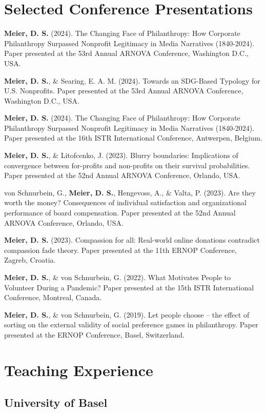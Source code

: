 \documentclass[11pt,letterpaper]{article}
\begin{document}
\section*{Selected Conference Presentations}

\textbf{Meier, D. S.} (2024). The Changing Face of Philanthropy: How Corporate Philanthropy Surpassed Nonprofit Legitimacy in Media Narratives (1840-2024). Paper presented at the 53rd Annual ARNOVA Conference, Washington D.C., USA.

\textbf{Meier, D. S.}, \& Searing, E. A. M. (2024). Towards an SDG-Based Typology for U.S. Nonprofits. Paper presented at the 53rd Annual ARNOVA Conference, Washington D.C., USA.

\textbf{Meier, D. S.} (2024). The Changing Face of Philanthropy: How Corporate Philanthropy Surpassed Nonprofit Legitimacy in Media Narratives (1840-2024). Paper presented at the 16th ISTR International Conference, Antwerpen, Belgium.

\textbf{Meier, D. S.}, \& Litofcenko, J. (2023). Blurry boundaries: Implications of convergence between for-profits and non-profits on their survival probabilities. Paper presented at the 52nd Annual ARNOVA Conference, Orlando, USA.

von Schnurbein, G., \textbf{Meier, D. S.}, Hengevoss, A., \& Valta, P. (2023). Are they worth the money? Consequences of individual satisfaction and organizational performance of board compensation. Paper presented at the 52nd Annual ARNOVA Conference, Orlando, USA.

\textbf{Meier, D. S.} (2023). Compassion for all: Real-world online donations contradict compassion fade theory. Paper presented at the 11th ERNOP Conference, Zagreb, Croatia.

\textbf{Meier, D. S.}, \& von Schnurbein, G. (2022). What Motivates People to Volunteer During a Pandemic? Paper presented at the 15th ISTR International Conference, Montreal, Canada.

\textbf{Meier, D. S.}, \& von Schnurbein, G. (2019). Let people choose – the effect of sorting on the external validity of social preference games in philanthropy. Paper presented at the ERNOP Conference, Basel, Switzerland.

\section*{Teaching Experience}

\subsection*{University of Basel}
\end{document}
